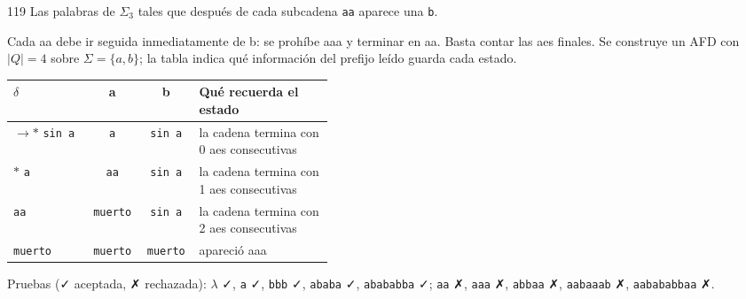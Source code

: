 \documentclass[11pt]{article}
\begin{document}
\begin{ejercicio}{119}{}
Las palabras de $\Sigma_3$ tales que después de cada subcadena \texttt{aa} aparece una \texttt{b}.
\end{ejercicio}
\proc Cada aa debe ir seguida inmediatamente de b: se prohíbe aaa y terminar en aa. Basta contar las aes finales. Se construye un AFD con $|Q| = 4$ sobre $\Sigma = \{a, b\}$; la tabla indica qué información del prefijo leído guarda cada estado.
\begin{center}\small\begin{tabular}{lccp{0.42\linewidth}}\toprule
$\delta$ & a & b & Qué recuerda el estado \\\midrule
$\to$$*$ \texttt{sin a} & \texttt{a} & \texttt{sin a} & la cadena termina con 0 aes consecutivas \\
$*$ \texttt{a} & \texttt{aa} & \texttt{sin a} & la cadena termina con 1 aes consecutivas \\
 \texttt{aa} & \texttt{muerto} & \texttt{sin a} & la cadena termina con 2 aes consecutivas \\
 \texttt{muerto} & \texttt{muerto} & \texttt{muerto} & apareció aaa \\
\bottomrule\end{tabular}\end{center}
Pruebas (✓ aceptada, ✗ rechazada): $\lambda$ ✓, \texttt{a} ✓, \texttt{bbb} ✓, \texttt{ababa} ✓, \texttt{abababba} ✓; \texttt{aa} ✗, \texttt{aaa} ✗, \texttt{abbaa} ✗, \texttt{aabaaab} ✗, \texttt{aabababbaa} ✗.
\end{document}
